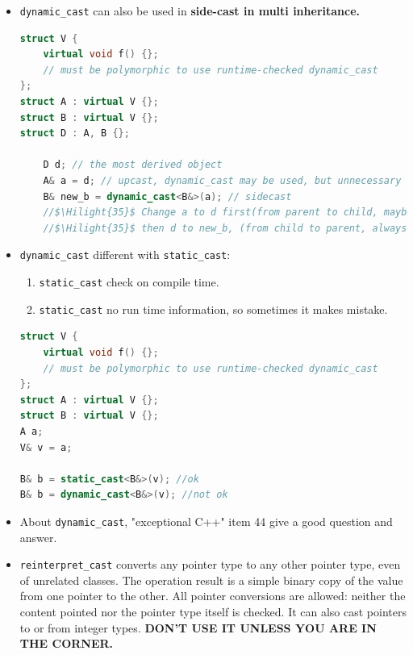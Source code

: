 \documentclass[a4paper,12pt,twoside]{book}
\newcommand{\Hilight}[1]{\makebox[0pt][l]{\color{yellow}\rule[-3pt]{#1em}{11pt}}}
\begin{document}
\begin{itemize}
\item \texttt{dynamic\_cast} can also be used in \textbf{side-cast in multi inheritance. }
\begin{lstlisting}[frame=single, language=c++, mathescape=true]
struct V {
    virtual void f() {};
    // must be polymorphic to use runtime-checked dynamic_cast
};
struct A : virtual V {};
struct B : virtual V {};
struct D : A, B {};

    D d; // the most derived object
    A& a = d; // upcast, dynamic_cast may be used, but unnecessary
    B& new_b = dynamic_cast<B&>(a); // sidecast
    //$\Hilight{35}$ Change a to d first(from parent to child, maybe fail), 
    //$\Hilight{35}$ then d to new_b, (from child to parent, always succeed)
\end{lstlisting}


\item \texttt{dynamic\_cast} different with \texttt{static\_cast}:
\begin{enumerate}
	\item \texttt{static\_cast} check on compile time.
	\item \texttt{static\_cast} no run time information, so sometimes it makes mistake.
\end{enumerate}
\begin{lstlisting}[frame=single, language=c++, mathescape=true]
struct V {
    virtual void f() {};
    // must be polymorphic to use runtime-checked dynamic_cast
};
struct A : virtual V {};
struct B : virtual V {};
A a;
V& v = a;

B& b = static_cast<B&>(v); //ok
B& b = dynamic_cast<B&>(v); //not ok
\end{lstlisting}


\item About \texttt{dynamic\_cast}, "exceptional C++" item 44 give a good question and answer.

\item \texttt{reinterpret\_cast} converts any pointer type to any other pointer type, even of unrelated classes. The operation result is a simple binary copy of the value from one pointer to the other. All pointer conversions are allowed: neither the content pointed nor the pointer type itself is checked. It can also cast pointers to or from integer types. \textbf{DON'T USE IT UNLESS YOU ARE IN THE CORNER.}
\end{itemize}
\end{document}

